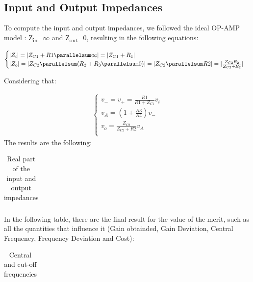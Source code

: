 \subsection{Input and Output Impedances}

To compute the input and output impedances, we followed the ideal OP-AMP model : Z\textsubscript{in}=$\infty$ and Z\textsubscript{out}=0, resulting in the following equations:

\begin{gather}\label{impedances}
\begin{cases}
  |Z_i| = |Z_{C1} + R1 \parallelsum \infty| = |Z_{C1} + R_1|\\
  |Z_o| = |Z_{C2} \parallelsum (R_2 + R_3 \parallelsum 0)| = |Z_{C2} \parallelsum R2| 
  = |\frac{Z_{C2}R_2}{Z_{C2}+R_2}|\\
 \end{cases}
\end{gather}

 Considering that:
 
 \begin{gather}
 \begin{cases}
    v_- = v_+ = \frac{R1}{R1+Z_{C1}} v_i\\
    v_A = \left(1 + \frac{R3}{R4}\right) v_-\\
    v_o = \frac{Z_{C2}}{Z_{C2}+R2} v_A\\
  \end{cases}
\end{gather}
The results are the following:

\begin{table}[!htb]
\centering
  \begin{tabular}{|c|c|}
    \hline    
    
 \end{tabular}
 \caption{Real part of the input and output impedances}\label{tab:theo:impedances}
\end{table}

In the following table, there are the final result for the value of the merit, such as all the quantities that influence it (Gain obtainded, Gain Deviation, Central Frequency, Frequency Deviation and Cost):


\begin{table}[!htb]
\centering
  \begin{tabular}{|c | c|}
    \hline    
    
 \end{tabular}
 \caption{Central and cut-off frequencies}\label{tab:theo:frequencies}
\end{table}



